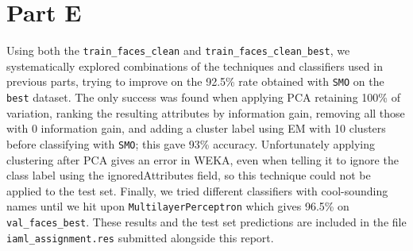 \documentclass[a4paper]{article}
\begin{document}

\section*{Part E}

Using both the {\tt train\_faces\_clean} and {\tt train\_faces\_clean\_best}, we systematically explored combinations of the techniques and classifiers used in previous parts, trying to improve on the 92.5\% rate obtained with {\tt SMO} on the {\tt best} dataset. The only success was found when applying PCA retaining 100\% of variation, ranking the resulting attributes by information gain, removing all those with 0 information gain, and adding a cluster label using EM with 10 clusters before classifying with {\tt SMO}; this gave 93\% accuracy. Unfortunately applying clustering after PCA gives an error in WEKA, even when telling it to ignore the class label using the ignoredAttributes field, so this technique could not be applied to the test set. Finally, we tried different classifiers with cool-sounding names until we hit upon {\tt MultilayerPerceptron} which gives 96.5\% on {\tt val\_faces\_best}. These results and the test set predictions are included in the file {\tt iaml\_assignment.res} submitted alongside this report.
\end{document}
